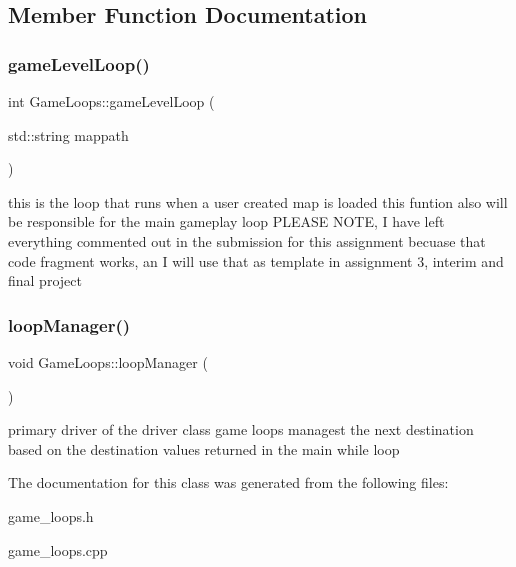 \subsection{Member Function Documentation}
\hypertarget{class_game_loops_aeeda849e01acbbd017f46a4d9f69a9d7}{}\label{class_game_loops_aeeda849e01acbbd017f46a4d9f69a9d7} 
\subsubsection{\texorpdfstring{game\+Level\+Loop()}{gameLevelLoop()}}
{\footnotesize\ttfamily int Game\+Loops\+::game\+Level\+Loop (\begin{DoxyParamCaption}\item[{std\+::string}]{mappath }\end{DoxyParamCaption})}

this is the loop that runs when a user created map is loaded this funtion also will be responsible for the main gameplay loop P\+L\+E\+A\+SE N\+O\+TE, I have left everything commented out in the submission for this assignment becuase that code fragment works, an I will use that as template in assignment 3, interim and final project \hypertarget{class_game_loops_a8aa13702c60f9e77a7dea9f698556ec0}{}\label{class_game_loops_a8aa13702c60f9e77a7dea9f698556ec0} 
\subsubsection{\texorpdfstring{loop\+Manager()}{loopManager()}}
{\footnotesize\ttfamily void Game\+Loops\+::loop\+Manager (\begin{DoxyParamCaption}{ }\end{DoxyParamCaption})}

primary driver of the driver class game loops managest the next destination based on the destination values returned in the main while loop 

The documentation for this class was generated from the following files\+:\begin{DoxyCompactItemize}
\item 
game\+\_\+loops.\+h\item 
game\+\_\+loops.\+cpp\end{DoxyCompactItemize}
